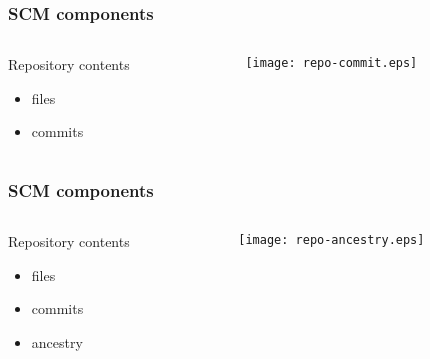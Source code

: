 \documentclass[english]{beamer}
\begin{document}
\begin{frame}
\frametitle{SCM components}
\begin{columns}[t]
        \begin{column}[T]{.5\textwidth}
                Repository contents
                \begin{itemize}
                        \item files
                        \item commits
                \end{itemize}
        \end{column}
        \begin{column}[T]{.5\textwidth}
                \vspace{.2\textheight}
                \texttt{[image: repo-commit.eps]}
        \end{column}
\end{columns}

\end{frame}

\begin{frame}
\frametitle{SCM components}
\begin{columns}[t]
        \begin{column}[T]{.5\textwidth}
                Repository contents
                \begin{itemize}
                        \item files
                        \item commits
                        \item ancestry
                \end{itemize}
        \end{column}
        \begin{column}[T]{.5\textwidth}
                \vspace{.2\textheight}
                \texttt{[image: repo-ancestry.eps]}
        \end{column}
\end{columns}

\end{frame}
\end{document}
